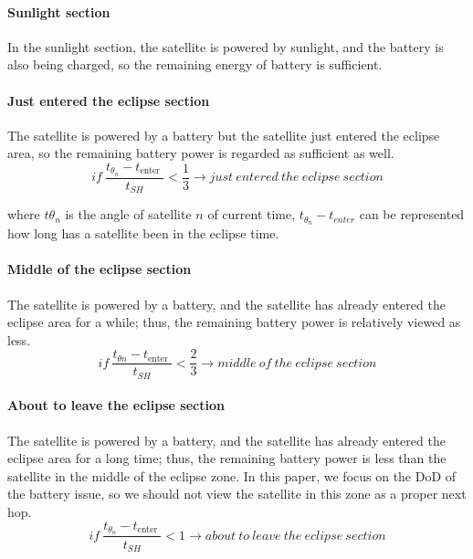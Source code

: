 \paragraph{Sunlight section}
In the sunlight section, the satellite is powered by sunlight, and the battery is also being charged, so the remaining energy of battery is sufficient.

\paragraph{Just entered the eclipse section}
The satellite is powered by a battery but the satellite just entered the eclipse area, so the remaining battery power is regarded as sufficient as well.
\begin{equation}
  if\  \frac{t_{\theta_{n}}-t_{\text {enter }}}{t_{S H}}<\frac{1}{3} \rightarrow  just\ entered\ the\ eclipse\ section
\end{equation}

where $t\theta_n$ is the angle of satellite $n$ of current time,  $t_{\theta_n}-t_{enter}$ can be represented how long has a satellite been in the eclipse time.

\paragraph{Middle of the eclipse section}
The satellite is powered by a battery, and the satellite has already entered the eclipse area for a while; thus, the remaining battery power is relatively viewed as less.
\begin{equation}
  if\  \frac{t_{\theta n}-t_{\text {enter }}}{t_{S H}}<\frac{2}{3} \rightarrow  middle\ of\ the\ eclipse\ section
\end{equation}

\paragraph{About to leave the eclipse section}
The satellite is powered by a battery, and the satellite has already entered the eclipse area for a long time; thus, the remaining battery power is less than the satellite in the middle of the eclipse zone. In this paper, we focus on the DoD of the battery issue, so we should not view the satellite in this zone as a proper next hop.
\begin{equation}
  if\  \frac{t_{\theta_{n}}-t_{\text {enter }}}{t_{S H}}<1 \rightarrow  about\ to\ leave\ the\ eclipse\ section
\end{equation}

